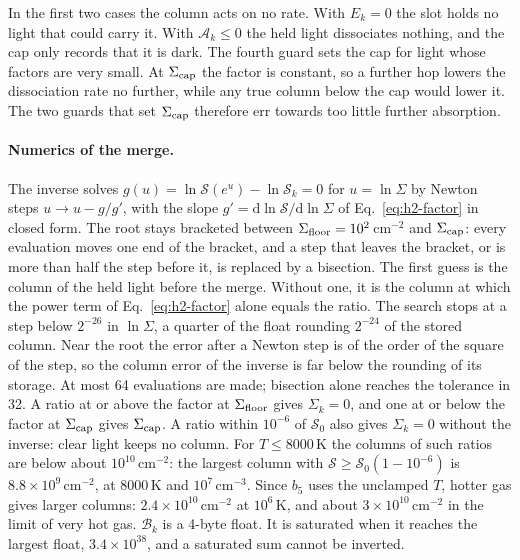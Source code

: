 In the first two cases the column acts on no rate. With $E_k=0$ the slot holds
no light that could carry it. With $\mathcal A_k\le0$ the held light
dissociates nothing, and the cap only records that it is dark. The fourth
guard sets the cap for light whose factors are very small. At $\Sigma_{\rm cap}$
the factor is constant, so a further hop lowers the dissociation rate no
further, while any true column below the cap would lower it. The two guards that set
$\Sigma_{\rm cap}$ therefore err towards too little further absorption.

\paragraph{Numerics of the merge.} The inverse solves
$g(u)=\ln\mathcal S(e^u)-\ln\mathcal S_k=0$ for $u=\ln\Sigma$ by Newton steps
$u\to u-g/g'$, with the slope $g'=\mathrm d\ln\mathcal S/\mathrm d\ln\Sigma$
of Eq.~\eqref{eq:h2-factor} in closed form. The root stays bracketed between
$\Sigma_{\rm floor}=10^{2}$\,cm$^{-2}$ and $\Sigma_{\rm cap}$: every
evaluation moves one end of the bracket, and a step that leaves the bracket,
or is more than half the step before it, is replaced by a bisection. The first
guess is the column of the held light before the merge. Without one, it is the
column at which the power term of Eq.~\eqref{eq:h2-factor} alone equals the
ratio. The search stops at a step below $2^{-26}$ in $\ln\Sigma$, a quarter of
the float rounding $2^{-24}$ of the stored column. Near the root the error
after a Newton step is of the order of the square of the step, so the column
error of the inverse is far below the rounding of its storage. At most 64
evaluations are made; bisection alone reaches the tolerance in 32. A ratio at or above the factor at
$\Sigma_{\rm floor}$ gives $\Sigma_k=0$, and one at or below the factor at
$\Sigma_{\rm cap}$ gives $\Sigma_{\rm cap}$. A ratio within $10^{-6}$ of
$\mathcal S_0$ also gives $\Sigma_k=0$ without the inverse: clear light keeps
no column. For $T\le8000$\,K the columns of such ratios are below about
$10^{10}$\,cm$^{-2}$: the largest column with
$\mathcal S\ge\mathcal S_0(1-10^{-6})$ is $8.8\times10^9$\,cm$^{-2}$, at
$8000$\,K and $10^7$\,cm$^{-3}$. Since $b_5$ uses the unclamped $T$, hotter gas
gives larger columns: $2.4\times10^{10}$\,cm$^{-2}$ at $10^6$\,K, and about
$3\times10^{10}$\,cm$^{-2}$ in the limit of very hot gas. $\mathcal B_k$ is a 4-byte float. It is
saturated when it reaches the largest float, $3.4\times10^{38}$, and a
saturated sum cannot be inverted.


